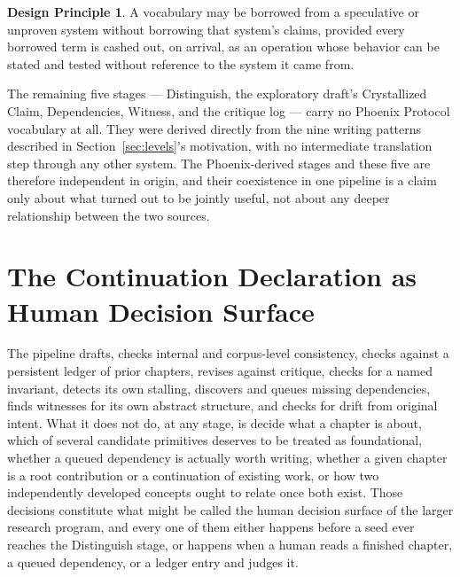 \documentclass[11pt]{article}
\theoremstyle{definition}
\newtheorem{principle}{Design Principle}
\begin{document}
\begin{principle}
A vocabulary may be borrowed from a speculative or unproven system
without borrowing that system's claims, provided every borrowed term is
cashed out, on arrival, as an operation whose behavior can be stated and
tested without reference to the system it came from.
\end{principle}

The remaining five stages --- Distinguish, the exploratory draft's
Crystallized Claim, Dependencies, Witness, and the critique log ---
carry no Phoenix Protocol vocabulary at all. They were derived directly
from the nine writing patterns described in Section~\ref{sec:levels}'s
motivation, with no intermediate translation step through any other
system. The Phoenix-derived stages and these five are therefore
independent in origin, and their coexistence in one pipeline is a claim
only about what turned out to be jointly useful, not about any deeper
relationship between the two sources.

\section{The Continuation Declaration as Human Decision Surface}
\label{sec:continuation-decl}

The pipeline drafts, checks internal and corpus-level consistency,
checks against a persistent ledger of prior chapters, revises against
critique, checks for a named invariant, detects its own stalling,
discovers and queues missing dependencies, finds witnesses for its own
abstract structure, and checks for drift from original intent. What it
does not do, at any stage, is decide what a chapter is about, which of
several candidate primitives deserves to be treated as foundational,
whether a queued dependency is actually worth writing, whether a given
chapter is a root contribution or a continuation of existing work, or
how two independently developed concepts ought to relate once both
exist. Those decisions constitute what might be called the human
decision surface of the larger research program, and every one of them
either happens before a seed ever reaches the Distinguish stage, or
happens when a human reads a finished chapter, a queued dependency, or
a ledger entry and judges it.
\end{document}
